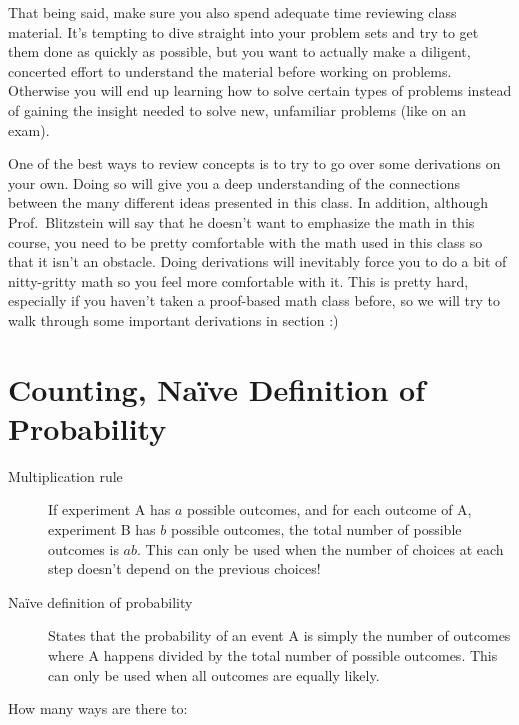 \documentclass[12pt]{article}
\begin{document}
That being said, make sure you also spend adequate time reviewing class material. It's tempting to dive straight into your problem sets and try to get them done as quickly as possible, but you want to actually make a diligent, concerted effort to understand the material before working on problems. Otherwise you will end up learning how to solve certain types of problems instead of gaining the insight needed to solve new, unfamiliar problems (like on an exam).

One of the best ways to review concepts is to try to go over some derivations on your own. Doing so will give you a deep understanding of the connections between the many different ideas presented in this class. In addition, although Prof.~Blitzstein will say that he doesn't want to emphasize the math in this course, you need to be pretty comfortable with the math used in this class so that it isn't an obstacle. Doing derivations will inevitably force you to do a bit of nitty-gritty math so you feel more comfortable with it. This is pretty hard, especially if you haven't taken a proof-based math class before, so we will try to walk through some important derivations in section :)

\section{Counting, Na\"{i}ve Definition of Probability}

\begin{description}

\item[Multiplication rule] If experiment A has $a$ possible outcomes, and for each outcome of A, experiment B has $b$ possible outcomes, the total number of possible outcomes is $ab$. This can only be used when the number of choices at each step doesn't depend on the previous choices!

\item[Na\"{i}ve definition of probability] States that the probability of an event A is simply the number of outcomes where A happens divided by the total number of possible outcomes. This can only be used when all outcomes are equally likely.

\end{description}

How many ways are there to:
\end{document}
